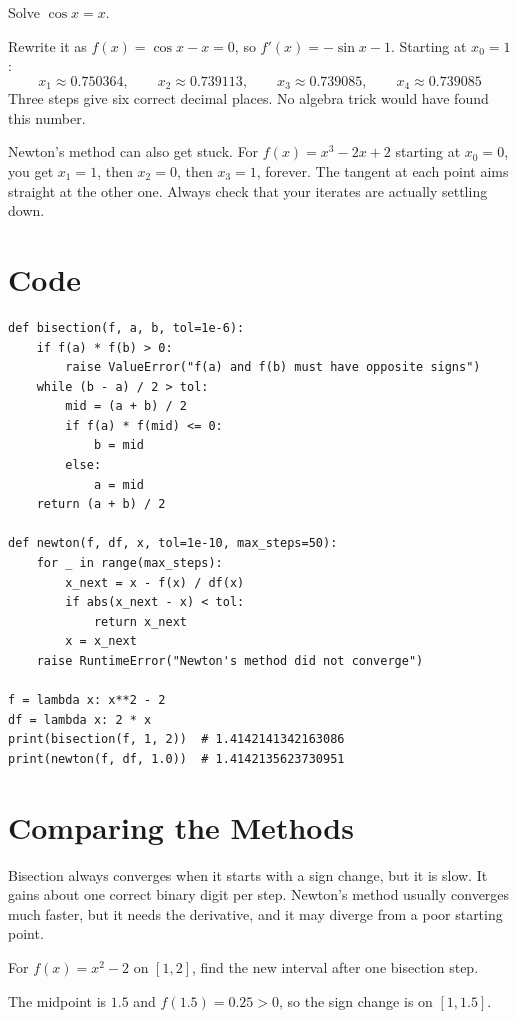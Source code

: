 \begin{Worked}
\begin{Problem}
Solve $\cos x = x$.
\end{Problem}
\begin{Solution}
Rewrite it as $f(x) = \cos x - x = 0$, so
$f'(x) = -\sin x - 1$. Starting at $x_0 = 1$:
$$x_1 \approx 0.750364, \qquad x_2 \approx 0.739113, \qquad x_3 \approx 0.739085, \qquad x_4 \approx 0.739085$$
Three steps give six correct decimal places. No algebra trick would have found
this number.
\end{Solution}
\end{Worked}

Newton's method can also get stuck. For $f(x) = x^3 - 2x + 2$ starting at
$x_0 = 0$, you get $x_1 = 1$, then $x_2 = 0$, then $x_3 = 1$, forever. The
tangent at each point aims straight at the other one. Always check that your
iterates are actually settling down.

\section{Code}
\begin{verbatim}
def bisection(f, a, b, tol=1e-6):
    if f(a) * f(b) > 0:
        raise ValueError("f(a) and f(b) must have opposite signs")
    while (b - a) / 2 > tol:
        mid = (a + b) / 2
        if f(a) * f(mid) <= 0:
            b = mid
        else:
            a = mid
    return (a + b) / 2

def newton(f, df, x, tol=1e-10, max_steps=50):
    for _ in range(max_steps):
        x_next = x - f(x) / df(x)
        if abs(x_next - x) < tol:
            return x_next
        x = x_next
    raise RuntimeError("Newton's method did not converge")

f = lambda x: x**2 - 2
df = lambda x: 2 * x
print(bisection(f, 1, 2))  # 1.4142141342163086
print(newton(f, df, 1.0))  # 1.4142135623730951
\end{verbatim}

\section{Comparing the Methods}
Bisection always converges when it starts with a sign change, but it is slow. It
gains about one correct binary digit per step. Newton's method usually converges
much faster, but it needs the derivative, and it may diverge from a poor starting point.

\begin{Exercise}[label=rootfind1, title=One bisection step]
For $f(x) = x^2 - 2$ on $[1, 2]$, find the new interval after one bisection step.
\end{Exercise}
\begin{Answer}[ref=rootfind1]
The midpoint is $1.5$ and $f(1.5) = 0.25 > 0$, so the sign change is on $[1, 1.5]$.
\end{Answer}

